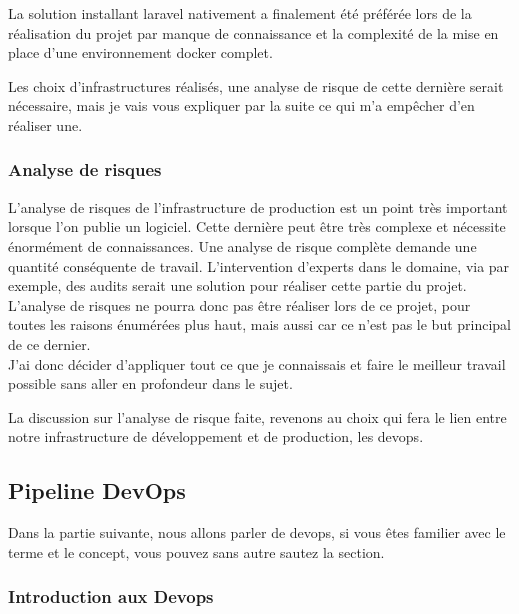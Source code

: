 \documentclass[
    iai, %
    il, %
]{heig-tb}
\begin{document}
La solution installant \Gls{laravel} nativement a finalement été préférée lors de la réalisation du projet par manque de connaissance et la complexité de la mise en place d'une environnement \Gls{docker} complet.

Les choix d'infrastructures réalisés, une analyse de risque de cette dernière serait nécessaire, mais je vais vous expliquer par la suite ce qui m'a empêcher d'en réaliser une.

\subsubsection{Analyse de risques}
L'analyse de risques de l'infrastructure de production est un point très important lorsque l'on publie un logiciel. Cette dernière peut être très complexe et nécessite énormément de connaissances.
Une analyse de risque complète demande une quantité conséquente de travail. L'intervention d'experts dans le domaine, via par exemple, des audits serait une solution pour réaliser cette partie du projet.\\
L'analyse de risques ne pourra donc pas être réaliser lors de ce projet, pour toutes les raisons énumérées plus haut, mais aussi car ce n'est pas le but principal de ce dernier.\\
J'ai donc décider d'appliquer tout ce que je connaissais et faire le meilleur travail possible sans aller en profondeur dans le sujet.

\clearpage

La discussion sur l'analyse de risque faite, revenons au choix qui fera le lien entre notre infrastructure de développement et de production, les \Gls{devops}.

\subsection{Pipeline DevOps}

Dans la partie suivante, nous allons parler de \Gls{devops}, si vous êtes familier avec le terme et le concept, vous pouvez sans autre sautez la section.

\subsubsection{Introduction aux Devops}
\end{document}
